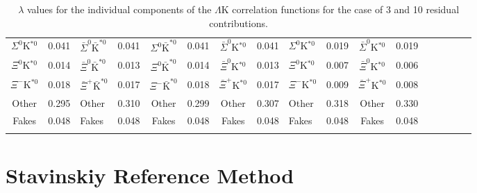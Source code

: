 \documentclass[ALICE,manyauthors]{cernphprep}
\newcommand{\LamK}{$\Lambda$K\xspace}
\begin{document}
\begin{landscape}
\begin{table}[htbp]
{\begin{tabular}{|c|cV{5.0}c|cV{5.0}c|cV{5.0}c|cV{5.0}c|cV{5.0}c|c|}
  $\Sigma^{0}$K$^{*0}$ & 0.041 & $\bar{\Sigma}^{0}\bar{\mathrm{K}}^{*0}$ & 0.041 & $\Sigma^{0}\bar{\mathrm{K}}^{*0}$ & 0.041 & $\bar{\Sigma}^{0}$K$^{*0}$ & 0.041 & $\Sigma^{0}$K$^{*0}$ & 0.019 & $\bar{\Sigma}^{0}$K$^{*0}$ & 0.019 \\
  
  $\Xi^{0}$K$^{*0}$ & 0.014 & $\bar{\Xi}^{0}\bar{\mathrm{K}}^{*0}$ & 0.013 & $\Xi^{0}\bar{\mathrm{K}}^{*0}$ & 0.014 & $\bar{\Xi}^{0}$K$^{*0}$ & 0.013 & $\Xi^{0}$K$^{*0}$ & 0.007 & $\bar{\Xi}^{0}$K$^{*0}$ & 0.006 \\
  
  $\Xi^{-}$K$^{*0}$ & 0.018 & $\bar{\Xi}^{+}\bar{\mathrm{K}}^{*0}$ & 0.017 & $\Xi^{-}\bar{\mathrm{K}}^{*0}$ & 0.018 & $\bar{\Xi}^{+}$K$^{*0}$ & 0.017 & $\Xi^{-}$K$^{*0}$ & 0.009 & $\bar{\Xi}^{+}$K$^{*0}$ & 0.008 \\
  
  Other & 0.295 & Other & 0.310 & Other & 0.299 & Other & 0.307 & Other & 0.318 & Other & 0.330 \\
  
  Fakes & 0.048 & Fakes & 0.048 & Fakes & 0.048 & Fakes & 0.048 & Fakes & 0.048 & Fakes & 0.048 \\
  
 \end{tabular}}
 \caption{$\lambda$ values for the individual components of the \LamK correlation functions for the case of 3 and 10 residual contributions.}
 \label{tab:LambdaValues_All}
\end{table}

\end{landscape}
\pagestyle{plain}



\section{Stavinskiy Reference Method}
\label{App:StavMethod}
\end{document}

